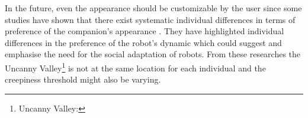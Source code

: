 \documentclass[smallextended]{svjour3}
\begin{document}
In the future, even the appearance should be customizable by the user since some studies have shown that there exist systematic individual differences in terms of preference of the companion's appearance \cite{Walters2008}. 
They have highlighted individual differences in the preference of the robot's dynamic which could suggest and emphasise the need for the social adaptation of robots. 
From these researches the Uncanny Valley\footnote{Uncanny Valley:} is not at the same location for each individual and the creepiness threshold might also be varying. 






\end{document}
